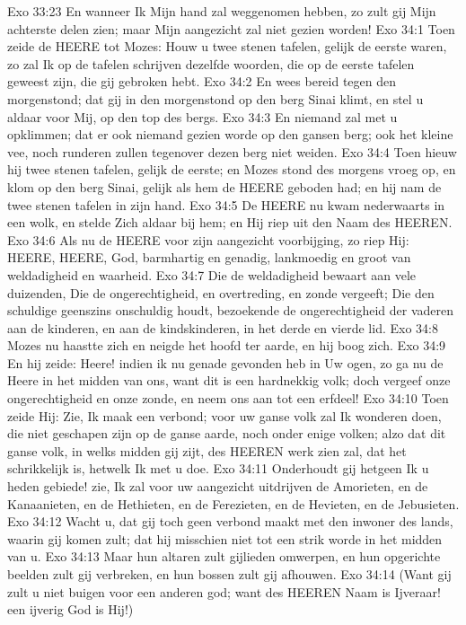 Exo 33:23  En wanneer Ik Mijn hand zal weggenomen hebben, zo zult gij Mijn achterste delen zien; maar Mijn aangezicht zal niet gezien worden!
Exo 34:1  Toen zeide de HEERE tot Mozes: Houw u twee stenen tafelen, gelijk de eerste waren, zo zal Ik op de tafelen schrijven dezelfde woorden, die op de eerste tafelen geweest zijn, die gij gebroken hebt.
Exo 34:2  En wees bereid tegen den morgenstond; dat gij in den morgenstond op den berg Sinai klimt, en stel u aldaar voor Mij, op den top des bergs.
Exo 34:3  En niemand zal met u opklimmen; dat er ook niemand gezien worde op den gansen berg; ook het kleine vee, noch runderen zullen tegenover dezen berg niet weiden.
Exo 34:4  Toen hieuw hij twee stenen tafelen, gelijk de eerste; en Mozes stond des morgens vroeg op, en klom op den berg Sinai, gelijk als hem de HEERE geboden had; en hij nam de twee stenen tafelen in zijn hand.
Exo 34:5  De HEERE nu kwam nederwaarts in een wolk, en stelde Zich aldaar bij hem; en Hij riep uit den Naam des HEEREN.
Exo 34:6  Als nu de HEERE voor zijn aangezicht voorbijging, zo riep Hij: HEERE, HEERE, God, barmhartig en genadig, lankmoedig en groot van weldadigheid en waarheid.
Exo 34:7  Die de weldadigheid bewaart aan vele duizenden, Die de ongerechtigheid, en overtreding, en zonde vergeeft; Die den schuldige geenszins onschuldig houdt, bezoekende de ongerechtigheid der vaderen aan de kinderen, en aan de kindskinderen, in het derde en vierde lid.
Exo 34:8  Mozes nu haastte zich en neigde het hoofd ter aarde, en hij boog zich.
Exo 34:9  En hij zeide: Heere! indien ik nu genade gevonden heb in Uw ogen, zo ga nu de Heere in het midden van ons, want dit is een hardnekkig volk; doch vergeef onze ongerechtigheid en onze zonde, en neem ons aan tot een erfdeel!
Exo 34:10  Toen zeide Hij: Zie, Ik maak een verbond; voor uw ganse volk zal Ik wonderen doen, die niet geschapen zijn op de ganse aarde, noch onder enige volken; alzo dat dit ganse volk, in welks midden gij zijt, des HEEREN werk zien zal, dat het schrikkelijk is, hetwelk Ik met u doe.
Exo 34:11  Onderhoudt gij hetgeen Ik u heden gebiede! zie, Ik zal voor uw aangezicht uitdrijven de Amorieten, en de Kanaanieten, en de Hethieten, en de Ferezieten, en de Hevieten, en de Jebusieten.
Exo 34:12  Wacht u, dat gij toch geen verbond maakt met den inwoner des lands, waarin gij komen zult; dat hij misschien niet tot een strik worde in het midden van u.
Exo 34:13  Maar hun altaren zult gijlieden omwerpen, en hun opgerichte beelden zult gij verbreken, en hun bossen zult gij afhouwen.
Exo 34:14  (Want gij zult u niet buigen voor een anderen god; want des HEEREN Naam is Ijveraar! een ijverig God is Hij!)

